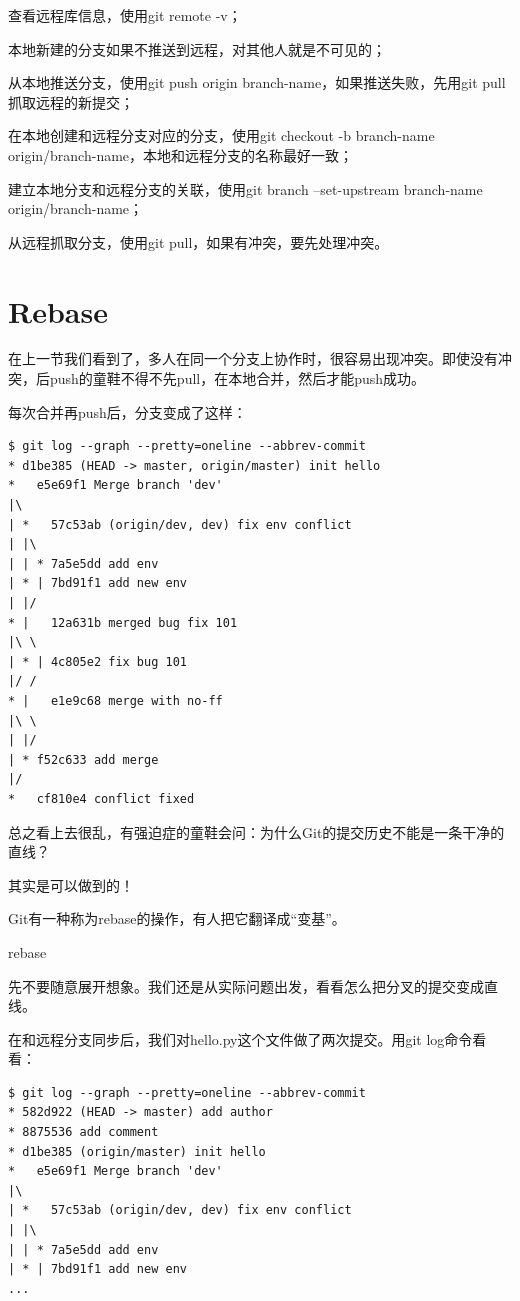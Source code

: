 \begin{tcolorbox}

查看远程库信息，使用git remote -v；

本地新建的分支如果不推送到远程，对其他人就是不可见的；

从本地推送分支，使用git push origin branch-name，如果推送失败，先用git pull抓取远程的新提交；

在本地创建和远程分支对应的分支，使用git checkout -b branch-name origin/branch-name，本地和远程分支的名称最好一致；

建立本地分支和远程分支的关联，使用git branch --set-upstream branch-name origin/branch-name；

从远程抓取分支，使用git pull，如果有冲突，要先处理冲突。
\end{tcolorbox}

\section{Rebase}
在上一节我们看到了，多人在同一个分支上协作时，很容易出现冲突。即使没有冲突，后push的童鞋不得不先pull，在本地合并，然后才能push成功。

每次合并再push后，分支变成了这样：

\begin{verbatim}
$ git log --graph --pretty=oneline --abbrev-commit
* d1be385 (HEAD -> master, origin/master) init hello
*   e5e69f1 Merge branch 'dev'
|\  
| *   57c53ab (origin/dev, dev) fix env conflict
| |\  
| | * 7a5e5dd add env
| * | 7bd91f1 add new env
| |/  
* |   12a631b merged bug fix 101
|\ \  
| * | 4c805e2 fix bug 101
|/ /  
* |   e1e9c68 merge with no-ff
|\ \  
| |/  
| * f52c633 add merge
|/  
*   cf810e4 conflict fixed
\end{verbatim}

总之看上去很乱，有强迫症的童鞋会问：为什么Git的提交历史不能是一条干净的直线？

其实是可以做到的！

Git有一种称为rebase的操作，有人把它翻译成“变基”。

rebase

先不要随意展开想象。我们还是从实际问题出发，看看怎么把分叉的提交变成直线。

在和远程分支同步后，我们对hello.py这个文件做了两次提交。用git log命令看看：

\begin{verbatim}
$ git log --graph --pretty=oneline --abbrev-commit
* 582d922 (HEAD -> master) add author
* 8875536 add comment
* d1be385 (origin/master) init hello
*   e5e69f1 Merge branch 'dev'
|\  
| *   57c53ab (origin/dev, dev) fix env conflict
| |\  
| | * 7a5e5dd add env
| * | 7bd91f1 add new env
...
\end{verbatim}

